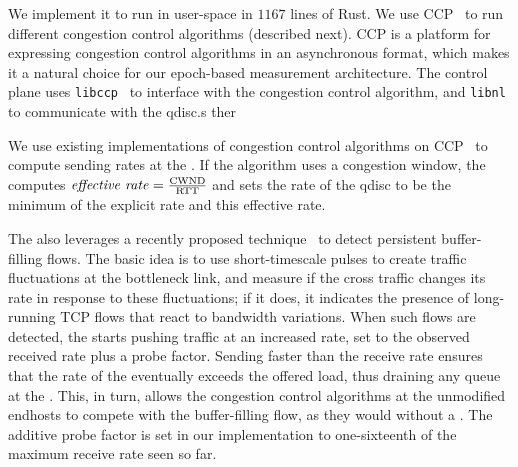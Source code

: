 
 We implement it to run in user-space in $1167$ lines of Rust.
We use CCP~\cite{ccp} to run different congestion control algorithms (described next). CCP is a platform for expressing congestion control algorithms in an asynchronous format, which makes it a natural choice for our epoch-based measurement architecture. The control plane uses \texttt{libccp}~\cite{ccp} to interface with the congestion control algorithm, and  \texttt{libnl} to communicate with the qdisc.s ther

 We use existing implementations of congestion control algorithms on CCP~\cite{nimbus, copa, bbr} to compute sending rates at the \inbox. If the algorithm uses a congestion window, the \inbox computes $\text{\emph{effective rate}} = \frac{\text{CWND}}{\text{RTT}}$ and sets the rate of the qdisc to be the minimum of the explicit rate and this effective rate.

The \inbox also leverages a recently proposed technique~\cite{nimbus} to detect persistent buffer-filling flows. The basic idea is to use short-timescale pulses to create traffic fluctuations at the bottleneck link, and measure if the cross traffic changes its rate in response to these fluctuations; if it does, it indicates the presence of long-running TCP flows that react to bandwidth variations. When such flows are detected, the \inbox  starts pushing traffic at an increased rate, set to the observed received rate plus a probe factor. Sending faster than the receive rate ensures that the rate of the \inbox eventually exceeds the offered load, thus draining any queue at the \inbox. This, in turn, allows the congestion control algorithms at the unmodified endhosts to compete with the buffer-filling flow, as they would without a \name. The additive probe factor is set in our implementation to one-sixteenth of the maximum receive rate seen so far. 

